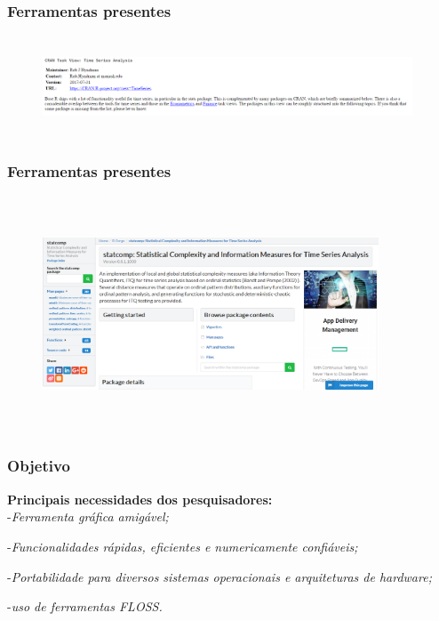 \documentclass[10pt, compress]{beamer}
\begin{document}
\begin{frame}[fragile]
\frametitle{Ferramentas presentes}

\begin{figure}
  \centering
   \includegraphics[width=11cm,height=3cm]{CRAN.png}
\end{figure}
\end{frame}

\begin{frame}[fragile]
\frametitle{Ferramentas presentes}

\begin{figure}
  \centering
   \includegraphics[width=10cm,height=7cm]{statcomp.png}
\end{figure}
\end{frame}

\begin{frame}[fragile]
\frametitle{Objetivo}
 
\textbf{\Large Principais necessidades dos pesquisadores:}\\

-\textit{Ferramenta gráfica amigável;}

-\textit{Funcionalidades
rápidas, eficientes e numericamente confiáveis;} 

-\textit{Portabilidade para diversos
sistemas operacionais e arquiteturas de hardware;}

-\textit{uso de ferramentas FLOSS.} 

\end{frame}
\end{document}
